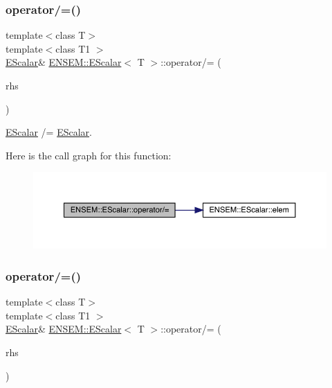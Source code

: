 \subsubsection{\texorpdfstring{operator/=()}{operator/=()}\hspace{0.1cm}{\footnotesize\ttfamily [2/3]}}
{\footnotesize\ttfamily template$<$class T$>$ \\
template$<$class T1 $>$ \\
\mbox{\hyperlink{classENSEM_1_1EScalar}{E\+Scalar}}\& \mbox{\hyperlink{classENSEM_1_1EScalar}{E\+N\+S\+E\+M\+::\+E\+Scalar}}$<$ T $>$\+::operator/= (\begin{DoxyParamCaption}\item[{const \mbox{\hyperlink{classENSEM_1_1EScalar}{E\+Scalar}}$<$ T1 $>$ \&}]{rhs }\end{DoxyParamCaption})\hspace{0.3cm}{\ttfamily [inline]}}



\mbox{\hyperlink{classENSEM_1_1EScalar}{E\+Scalar}} /= \mbox{\hyperlink{classENSEM_1_1EScalar}{E\+Scalar}}. 

Here is the call graph for this function\+:
\nopagebreak
\begin{figure}[H]
\begin{center}
\leavevmode
\includegraphics[width=350pt]{d0/d82/classENSEM_1_1EScalar_a09524cf0f6f5baf9c421d03df58fe8d6_cgraph}
\end{center}
\end{figure}
\mbox{\label{classENSEM_1_1EScalar_a09524cf0f6f5baf9c421d03df58fe8d6}} 
\subsubsection{\texorpdfstring{operator/=()}{operator/=()}\hspace{0.1cm}{\footnotesize\ttfamily [3/3]}}
{\footnotesize\ttfamily template$<$class T$>$ \\
template$<$class T1 $>$ \\
\mbox{\hyperlink{classENSEM_1_1EScalar}{E\+Scalar}}\& \mbox{\hyperlink{classENSEM_1_1EScalar}{E\+N\+S\+E\+M\+::\+E\+Scalar}}$<$ T $>$\+::operator/= (\begin{DoxyParamCaption}\item[{const \mbox{\hyperlink{classENSEM_1_1EScalar}{E\+Scalar}}$<$ T1 $>$ \&}]{rhs }\end{DoxyParamCaption})\hspace{0.3cm}{\ttfamily [inline]}}



